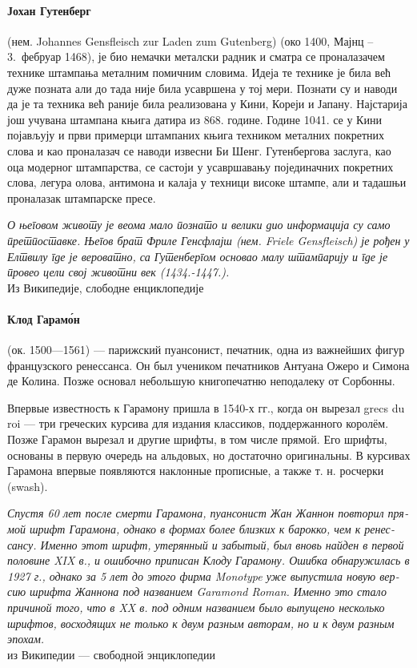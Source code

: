 \documentclass[pagesize,DIV14]{scrartcl}
\begin{document}
\begin{multicols}{2}
\begin{serbian}
\paragraph*{%
 Јохан Гутенберг} (нем. Johannes Gensfleisch zur Laden zum Gutenberg) (око 1400, Мајнц – 3.~фебруар 1468), је био немачки металски радник и сматра се проналазачем технике штампања металним помичним словима. Идеја те технике је била већ дуже позната али до тада није била усавршена у тој мери. Познати су и наводи да је та техника већ раније била реализована у Кини, Кореји и Јапану. Најстарија још учувана штампана књига датира из 868. године. Године 1041. се у Кини појављују и први примерци штампаних књига техником металних покретних слова и као проналазач се наводи извесни Би Шенг. Гутенбергова заслуга, као оца модерног штампарства, се састоји у усавршавању појединачних покретних слова, легура олова, антимона и калаја у техници високе штампе, али и тадашњи проналазак штампарске пресе.\par
\textit{О његовом животу је веома мало познато и велики дио информација су само претпоставке. Његов брат Фриле Генсфлајш (нем. Friele Gensfleisch) је рођен у Елтвилу где је вероватно, са Гутенбергом основао малу штампарију и где је провео цели свој животни век (1434.-1447.).}\\
{\scriptsize Из Википедије, слободне енциклопедије}
\end{serbian}

\begin{russian}
\paragraph*{Клод Гарамо́н} (ок. 1500—1561) — парижский пуансонист, печатник, одна из важнейших фигур французского ренессанса. Он был учеником печатников Антуана Ожеро и Симона де Колина. Позже основал небольшую книгопечатню неподалеку от Сорбонны.\par
Впервые известность к Гарамону пришла в 1540-х гг., когда он вырезал grecs du roi — три греческих курсива для издания классиков, поддержанного королём. Позже Гарамон вырезал и другие шрифты, в том числе прямой. Его шрифты, основаны в первую очередь на альдовых, но достаточно оригинальны. В курсивах Гарамона впервые появляются наклонные прописные, а также т. н. росчерки (swash).\par
\textit{Спустя 60 лет после смерти Гарамона, пуансонист Жан Жаннон повторил прямой шрифт Гарамона, однако в формах более близких к барокко, чем к ренессансу. Именно этот шрифт, утерянный и забытый, был вновь найден в первой половине XIX в., и ошибочно приписан Клоду Гарамону. Ошибка обнаружилась в 1927 г., однако за 5 лет до этого фирма Monotype уже выпустила новую версию шрифта Жаннона под названием Garamond Roman. Именно это стало причиной того, что в XX в. под одним названием было выпущено несколько шрифтов, восходящих не только к двум разным авторам, но и к двум разным эпохам.}
\\
{\scriptsize из Википедии — свободной энциклопедии}
\end{russian}


\end{multicols}
\end{document}
